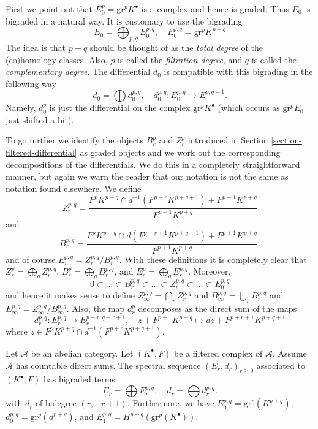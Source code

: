 \medskip\noindent
First we point out that $E_0^p = \text{gr}^p K^\bullet$ is a
complex and hence is graded. Thus $E_0$ is bigraded in a natural
way. It is customary to use the bigrading
$$
E_0 = \bigoplus\nolimits_{p, q} E_0^{p, q},
\quad
E_0^{p, q} = \text{gr}^p K^{p + q}
$$
The idea is that $p + q$ should be thought of as the {\it total degree} of
the (co)homology classes. Also, $p$ is called the {\it filtration degree},
and $q$ is called the {\it complementary degree}.
The differential $d_0$ is compatible with this
bigrading in the following way
$$
d_0  = \bigoplus d_0^{p, q},
\quad
d_0^{p, q} : E_0^{p, q} \to E_0^{p, q + 1}.
$$
Namely, $d_0^p$ is just the differential on the complex
$\text{gr}^p K^\bullet$ (which occurs as $\text{gr}^pE_0$ just shifted
a bit).

\medskip\noindent
To go further we identify the objects $B_r^p$ and $Z_r^p$ introduced
in Section \ref{section-filtered-differential} as graded objects and
we work out the corresponding decompositions of the differentials.
We do this in a completely straightforward manner, but again we warn
the reader that our notation is not the same as notation found
elsewhere. We define
$$
Z_r^{p, q} =
\frac{F^pK^{p + q} \cap d^{-1}(F^{p + r}K^{p + q + 1}) + F^{p + 1}K^{p + q}}
{F^{p + 1}K^{p + q}}
$$
and
$$
B_r^{p, q} =
\frac{F^pK^{p + q} \cap d(F^{p - r + 1}K^{p + q - 1}) + F^{p + 1}K^{p + q}}
{F^{p + 1}K^{p + q}}.
$$
and of course $E_r^{p, q} = Z_r^{p, q}/B_r^{p, q}$.
With these definitions it is completely clear that
$Z_r^p = \bigoplus_q Z_r^{p, q}$,
$B_r^p = \bigoplus_q B_r^{p, q}$, and
$E_r^p = \bigoplus_q E_r^{p, q}$. Moreover,
$$
0 \subset \ldots \subset B_r^{p, q} \subset
\ldots
\subset Z_r^{p, q} \subset \ldots \subset E_0^{p, q}
$$
and hence it makes sense to define $Z_\infty^{p, q} = \bigcap_r Z_r^{p, q}$
and $B_\infty^{p, q} = \bigcup_r B_r^{p, q}$ and
$E_\infty^{p, q} = Z_\infty^{p, q}/B_\infty^{p, q}$.
Also, the map $d_r^p$ decomposes as the direct sum of the maps
$$
d_r^{p, q} : E_r^{p, q} \longrightarrow E_r^{p + r, q - r + 1},
\quad
z + F^{p + 1}K^{p + q}
\mapsto
dz + F^{p + r + 1}K^{p + q + 1}
$$
where $z \in F^pK^{p + q} \cap d^{-1}(F^{p + r}K^{p + q + 1})$.

\begin{lemma}
\label{lemma-spectral-sequence-filtered-complex}
Let $\mathcal{A}$ be an abelian category.
Let $(K^\bullet, F)$ be a filtered complex of $\mathcal{A}$.
Assume $\mathcal{A}$ has countable direct sums.
The spectral sequence $(E_r, d_r)_{r \geq 0}$
associated to $(K^\bullet, F)$ has bigraded terms
$$
E_r = \bigoplus E_r^{p, q},
\quad
d_r = \bigoplus d_r^{p, q}.
$$
with $d_r$ of bidegree $(r, - r + 1)$.
Furthermore, we have
$E_0^{p, q} = \text{gr}^p(K^{p + q})$,
$d_0^{p, q} = \text{gr}^p(d^{p + q})$,
and $E_1^{p, q} = H^{p + q}(\text{gr}^p(K^\bullet))$.
\end{lemma}

